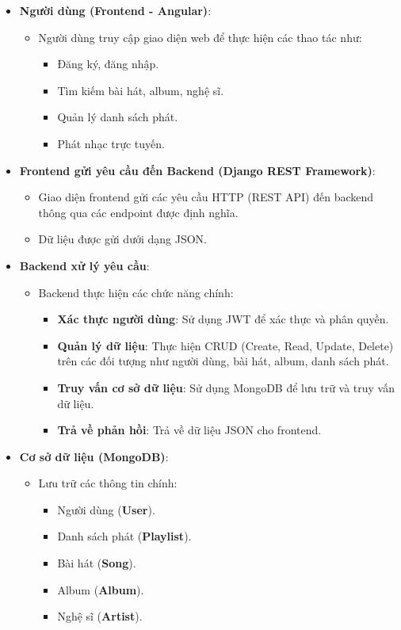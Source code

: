\begin{itemize}
    \item \textbf{Người dùng (Frontend - Angular)}:
    \begin{itemize}
        \item Người dùng truy cập giao diện web để thực hiện các thao tác như:
        \begin{itemize}
            \item Đăng ký, đăng nhập.
            \item Tìm kiếm bài hát, album, nghệ sĩ.
            \item Quản lý danh sách phát.
            \item Phát nhạc trực tuyến.
        \end{itemize}
    \end{itemize}

    \item \textbf{Frontend gửi yêu cầu đến Backend (Django REST Framework)}:
    \begin{itemize}
        \item Giao diện frontend gửi các yêu cầu HTTP (REST API) đến backend thông qua các endpoint được định nghĩa.
        \item Dữ liệu được gửi dưới dạng JSON.
    \end{itemize}

    \item \textbf{Backend xử lý yêu cầu}:
    \begin{itemize}
        \item Backend thực hiện các chức năng chính:
        \begin{itemize}
            \item \textbf{Xác thực người dùng}: Sử dụng JWT để xác thực và phân quyền.
            \item \textbf{Quản lý dữ liệu}: Thực hiện CRUD (Create, Read, Update, Delete) trên các đối tượng như người dùng, bài hát, album, danh sách phát.
            \item \textbf{Truy vấn cơ sở dữ liệu}: Sử dụng MongoDB để lưu trữ và truy vấn dữ liệu.
            \item \textbf{Trả về phản hồi}: Trả về dữ liệu JSON cho frontend.
        \end{itemize}
    \end{itemize}

    \item \textbf{Cơ sở dữ liệu (MongoDB)}:
    \begin{itemize}
        \item Lưu trữ các thông tin chính:
        \begin{itemize}
            \item Người dùng (\textbf{User}).
            \item Danh sách phát (\textbf{Playlist}).
            \item Bài hát (\textbf{Song}).
            \item Album (\textbf{Album}).
            \item Nghệ sĩ (\textbf{Artist}).
        \end{itemize}
    \end{itemize}


\end{itemize}
